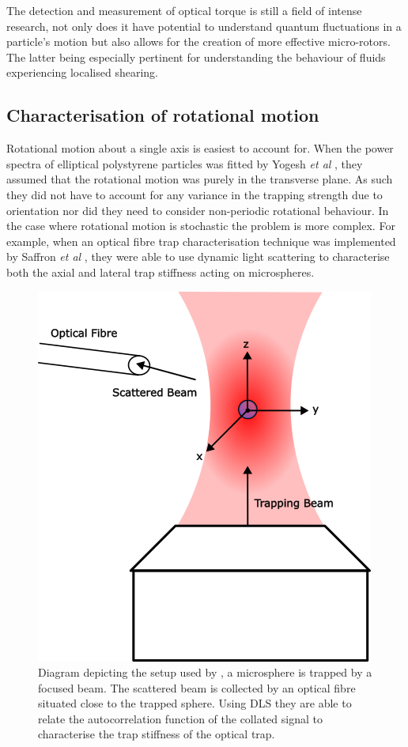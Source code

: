 The detection and measurement of optical torque is still a 
field of intense research, not only does it have potential 
to understand quantum fluctuations in a particle's motion 
but also allows for the creation of more effective
micro-rotors. The latter being especially pertinent for 
understanding the behaviour of fluids experiencing localised 
shearing.

\subsection{Characterisation of rotational motion}
Rotational motion about a single axis is easiest to account for.  
When the power spectra of elliptical polystyrene particles was 
fitted by Yogesh \textit{et al} \cite{Yogesha2011PreciseCO}, they 
assumed that the rotational motion was purely in the transverse
plane. As such they did not have to account for any variance in 
the trapping strength due to orientation nor did they need to
consider non-periodic rotational behaviour. In the case where 
rotational motion is stochastic the problem is more complex. 
For example, when an optical fibre trap characterisation 
technique was implemented by Saffron \textit{et al} 
\cite{BarZiv1997, Meller1998}, they were able to use dynamic 
light scattering to characterise both the axial and lateral 
trap stiffness acting on microspheres. 

\begin{figure}[h!]
	\centering
	\includegraphics[width=\linewidth]{BarZivDiagram.png}
	\caption{Diagram depicting the setup used by \cite{BarZiv1997}, 
	a microsphere is trapped by a focused beam. The scattered beam
	is collected by an optical fibre situated close to the trapped
	sphere. Using DLS they are able to relate the autocorrelation 
	function of the collated signal to characterise the trap stiffness 
	of the optical trap.}
\end{figure}

